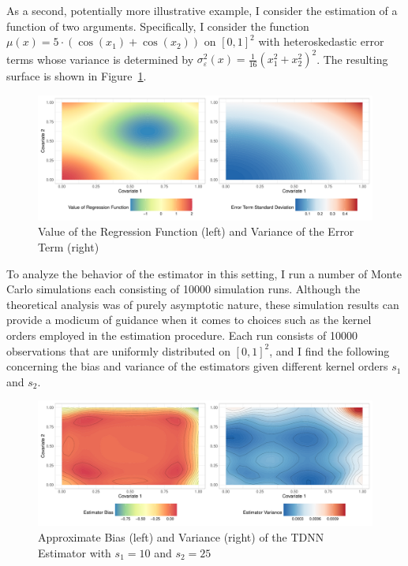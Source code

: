 \newpage
As a second, potentially more illustrative example, I consider the estimation of a function of two arguments.
Specifically, I consider the function $\mu(x) = 5 \cdot \left(\cos(x_1) + \cos(x_2)\right)$ on $[0,1]^2$ with heteroskedastic error terms whose variance is determined by $\sigma_{\varepsilon}^2(x) = \frac{1}{16}\left(x_1^2 + x_2^2\right)^2$.
The resulting surface is shown in Figure~\ref{fig:reg_surface}.

\begin{figure}[H]
	\centering
	\includegraphics[width = \textwidth]{../Graphics/Reg_Exmp1.pdf}
	\caption{Value of the Regression Function (left) and Variance of the Error Term (right)}
	\label{fig:reg_surface}
\end{figure}
To analyze the behavior of the estimator in this setting, I run a number of Monte Carlo simulations each consisting of 10000 simulation runs.
Although the theoretical analysis was of purely asymptotic nature, these simulation results can provide a modicum of guidance when it comes to choices such as the kernel orders employed in the estimation procedure.
Each run consists of 10000 observations that are uniformly distributed on ${[0,1]}^2$, and I find the following concerning the bias and variance of the estimators given different kernel orders $s_1$ and $s_2$.
\begin{figure}[H]
	\centering
	\includegraphics[width = \textwidth]{../Code/Simulations/Graphics/Reg_Exp1/TDNN/Plot_TDNN_n10000s_10_25.RDS.pdf}
	\caption{Approximate Bias (left) and Variance (right) of the TDNN Estimator with $s_1 = 10$ and $s_2 = 25$}
	\label{fig:est_bias_var_2}
\end{figure}
